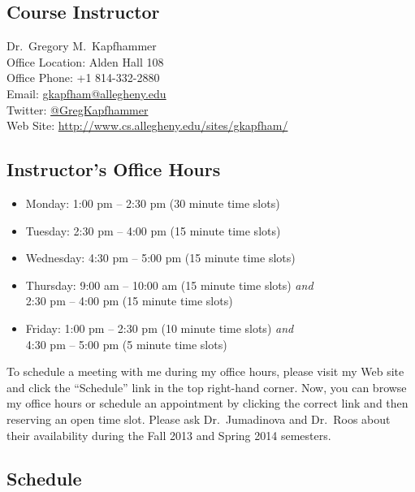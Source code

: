 


\subsection*{Course Instructor}
Dr.\ Gregory M.\ Kapfhammer\\
\noindent Office Location: Alden Hall 108 \\
\noindent Office Phone: +1 814-332-2880 \\
\noindent Email: \url{gkapfham@allegheny.edu} \\
\noindent Twitter: \url{@GregKapfhammer} \\
\noindent Web Site: \url{http://www.cs.allegheny.edu/sites/gkapfham/} 

\subsection*{Instructor's Office Hours}

\begin{itemize}
	\itemsep 0em
	\item Monday: 1:00 pm -- 2:30 pm (30 minute time slots)
	\item Tuesday: 2:30 pm -- 4:00 pm (15 minute time slots)
	\item Wednesday: 4:30 pm -- 5:00 pm (15 minute time slots)
	\item Thursday: 9:00 am -- 10:00 am (15 minute time slots) {\em and} \\ \hspace*{.69in} 2:30 pm -- 4:00 pm (15 minute time slots)
	\item Friday: 1:00 pm -- 2:30 pm (10 minute time slots) {\em and} \\ \hspace*{.49in} 4:30 pm -- 5:00 pm (5 minute time slots)
\end{itemize}

\noindent
To schedule a meeting with me during my office hours, please visit my Web site and click the ``Schedule'' link in the
top right-hand corner. Now, you can browse my office hours or schedule an appointment by clicking the correct link and
then reserving an open time slot.  Please ask Dr.\ Jumadinova and Dr.\ Roos about their availability during the Fall
2013 and Spring 2014 semesters.

\subsection*{Schedule}

